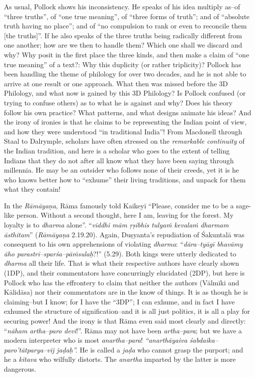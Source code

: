As usual, Pollock shows his inconsistency. He speaks of his idea multiply as–of “three truths”, of “one true meaning”, of “three forms of truth”; and of “absolute truth having no place”; and of “no compulsion to rank or even to reconcile them [the truths]”. If he also speaks of the three truths being radically different from one another; how are we then to handle them? Which one shall we discard and why? Why posit in the first place the three kinds, and then make a claim of “one true meaning” of a text?: Why this duplicity (or rather triplicity)? Pollock has been handling the theme of philology for over two decades, and he is not able to arrive at one result or one approach. What then was missed before the 3D Philology, and what now is gained by this 3D Philology? Is Pollock confused (or trying to confuse others) as to what he is against and why? Does his theory follow his own practice? What patterns, and what designs animate his ideas? And the irony of ironies is that he claims to be representing the Indian point of view, and how they were understood “in traditional India”! From Macdonell through Staal to Dalrymple, scholars have often stressed on the \textit{remarkable continuity} of the Indian tradition, and here is a scholar who goes to the extent of telling Indians that they do not after all know what they have been saying through millennia. He may be an outsider who follows none of their creeds, yet it is he who knows better how to “exhume” their living traditions, and unpack for them what they contain!

In the \textit{Rāmāyaṇa}, Rāma famously told Kaikeyī “Please, consider me to be a sage-like person. Without a second thought, here I am, leaving for the forest. My loyalty is to \textit{dharma} alone”. “\textit{viddhi mām ṛṣibhis tulyaṁ kevalaṁ dharmam āsthitam}” (\textit{Rāmāyaṇa} 2.19.20). Again, Duṣyanta’s repudiation of Śakuntalā was consequent to his own apprehensions of violating \textit{dharma}: “\textit{dāra–tyāgī bhavāmy āho parastrī–sparśa–pāṁsulaḥ}?!” (5.29). Both kings were utterly dedicated to \textit{dharma} all their life. That is what their respective authors have clearly shown (1DP), and their commentators have concurringly elucidated (2DP), but here is Pollock who has the effrontery to claim that neither the authors (Vālmīki and Kālidāsa) nor their commentators are in the know of things. It is as though he is claiming–but I know; for I have the “3DP”; I can exhume, and in fact I have exhumed the structure of signification–and it is all just politics, it is all a play for securing power! And the irony is that Rāma even said most clearly and directly: “\textit{nāham artha–paro devi}!”. Rāma may not have been \textit{artha–para}; but we have a modern interpreter who is most \textit{anartha–para}! \textit{“anarthāyaiva śabdaika–paro’tātparya–vij jaḍaḥ”.} He is called a \textit{jaḍa} who cannot grasp the purport; and he a \textit{kitava} who wilfully distorts. The \textit{anartha} imparted by the latter is more dangerous.

